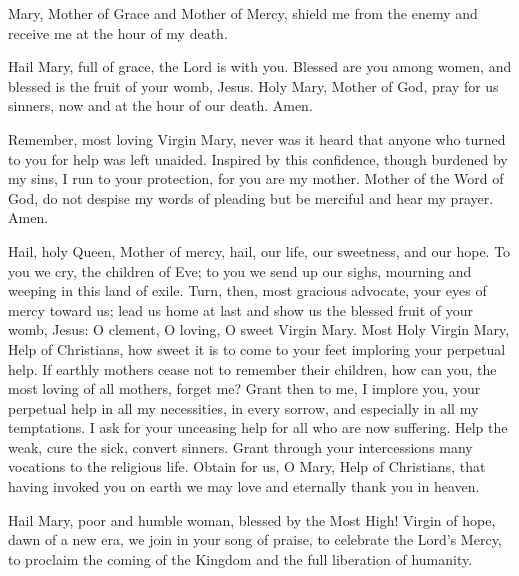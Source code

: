 Mary, Mother of Grace and Mother of Mercy, shield me from the enemy and receive me at the hour of my death.

Hail Mary, full of grace, the Lord is with you.
Blessed are you among women, and blessed is the fruit of your womb, Jesus.
Holy Mary, Mother of God, pray for us sinners, now and at the hour of our death.
Amen.

Remember, most loving Virgin Mary, never was it heard that anyone who turned to you for help
was left unaided.
Inspired by this confidence, though burdened by my sins, I run to your protection, for you are my mother.
Mother of the Word of God, do not despise my words of pleading but be merciful and hear my prayer.
Amen.

Hail, holy Queen, Mother of mercy, hail, our life, our sweetness, and our hope.
To you we cry, the children of Eve;
to you we send up our sighs, mourning and weeping in this land of exile.
Turn, then, most gracious advocate, your eyes of mercy toward us;
lead us home at last and show us the blessed fruit of your womb, Jesus:
O clement, O loving, O sweet Virgin Mary.
\newpage
{}
\label{prayer:Our_Lady_help_of_Christians}
Most Holy Virgin Mary, Help of Christians, how sweet it is to come to your feet
imploring your perpetual help.
If earthly mothers cease not to remember their children, how can you, the most loving of all mothers, forget me?
Grant then to me, I implore you, your perpetual help in all my necessities, in every sorrow, and especially in all my temptations.
I ask for your unceasing help for all who are now suffering.
Help the weak, cure the sick, convert sinners.
Grant through your intercessions many vocations to the religious life.
Obtain for us, O Mary, Help of Christians, that having invoked you on earth we may love and eternally thank you in heaven.

\label{prayer:JPII_Lady_of_Lourdes}
Hail Mary, poor and humble woman, blessed by the Most High!
Virgin of hope, dawn of a new era, we join in your song of praise, to celebrate the Lord's Mercy, to proclaim the coming of the Kingdom and the full liberation of humanity.

